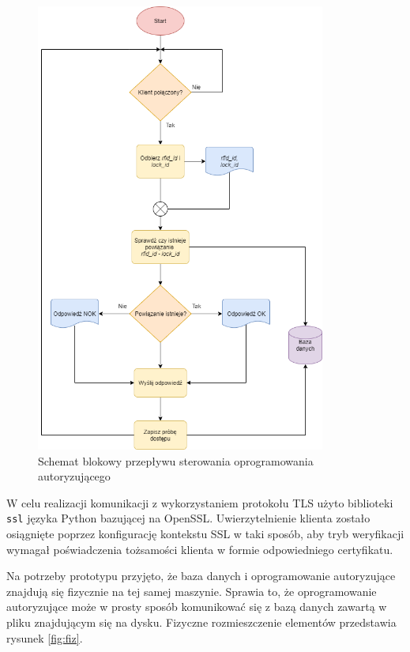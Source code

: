     	\begin{figure}[]
            \centering
            \includegraphics[width=0.85\textwidth]{chapters/images/flowchart5.png}
            \caption{Schemat blokowy przepływu sterowania oprogramowania autoryzującego}
            \label{fig:flowchart5}
        \end{figure}

    	W celu realizacji komunikacji z wykorzystaniem protokołu TLS użyto biblioteki \texttt{ssl} języka Python bazującej na OpenSSL. Uwierzytelnienie klienta zostało osiągnięte poprzez konfigurację kontekstu SSL w taki sposób, aby tryb weryfikacji wymagał poświadczenia tożsamości klienta w formie odpowiedniego certyfikatu.

    	Na potrzeby prototypu przyjęto, że baza danych i oprogramowanie autoryzujące znajdują się fizycznie na tej samej maszynie. Sprawia to, że oprogramowanie autoryzujące może w prosty sposób komunikować się z bazą danych zawartą w pliku znajdującym się na dysku. Fizyczne rozmieszczenie elementów przedstawia rysunek \ref{fig:fiz}.

